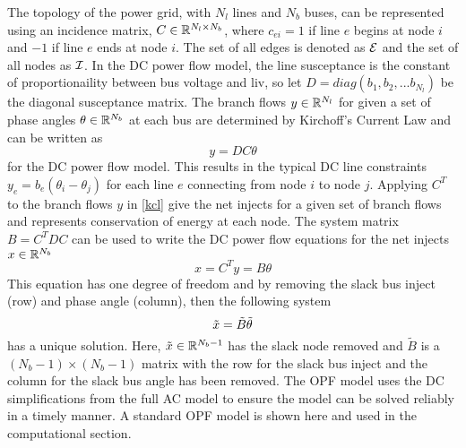 The topology of the power grid, with $N_l$ lines and $N_b$ buses, can be represented using an incidence matrix, $C \in \mathbb{R}^{N_l \times N_b}$, where $c_{ei}=1$ if line $e$ begins at node $i$ and $-1$ if line $e$ ends at node $i$.  The set of all edges is denoted as $\mathcal{E}$ and the set of all nodes as $\mathcal{I}$.  In the DC power flow model, the line susceptance is the constant of proportionaility between bus voltage and liv, so let $D=diag\left(b_1,b_2,...b_{N_l}\right)$ be the diagonal susceptance matrix.  The branch flows $y \in \mathbb{R}^{N_l}$ for given a set of phase angles $\theta \in \mathbb{R}^{N_b}$ at each bus are determined by Kirchoff's Current Law and can be written as
\begin{equation}\label{kcl}
y=D C \theta
\end{equation}
for the DC power flow model.  This results in the typical DC line constraints $y_{e} = b_{e} (\theta_i - \theta_j)$ for each line $e$ connecting from node $i$ to node $j$.  Applying $C^T$ to the branch flows $y$ in \cref{kcl} give the net injects for a given set of branch flows and represents conservation of energy at each node.
  The system matrix $B = C^T D C$ can be used to write the DC power flow equations for the net injects $x \in \mathbb{R}^{N_b}$
\begin{equation}\label{dcpow}
x = C^T y = B \theta
\end{equation}
This equation has one degree of freedom and by removing the slack bus inject (row) and phase angle (column), then the following system
\begin{equation}
\tilde{x} = \tilde{B} \tilde{\theta}
\end{equation}
has a unique solution.   Here, $\tilde{x} \in \mathbb{R}^{N_b-1}$ has the slack node removed and $\tilde{B}$ is a $(N_b-1) \times (N_b-1)$ matrix with the row for the slack bus inject and the column for the slack bus angle has been removed.  The OPF model uses the DC simplifications from the full AC model to ensure the model can be solved reliably in a timely manner.  A standard OPF model is shown here and used in the computational section.

